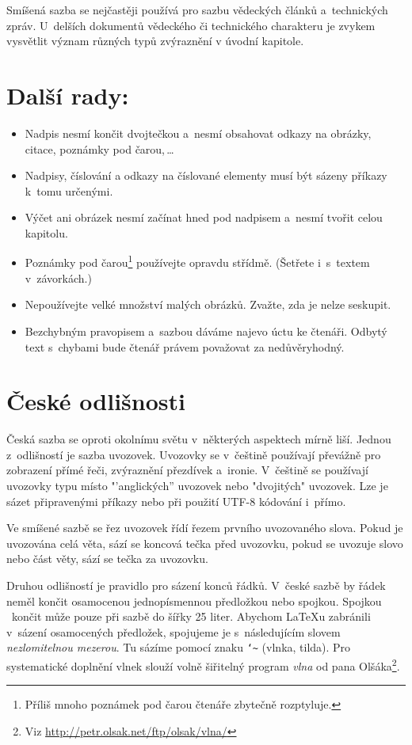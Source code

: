\documentclass[10pt, a4paper, twocolumn]{article}
\begin{document}
Smíšená sazba se nejčastěji používá pro sazbu vědeckých článků a~technických zpráv. U~delších dokumentů vědeckého či technického charakteru je zvykem vysvětlit význam různých typů zvýraznění v úvodní kapitole.

\section{Další rady:}\label{sec:DaRa}

\begin{itemize}
\item Nadpis nesmí končit dvojtečkou a~nesmí obsahovat odkazy na obrázky, citace, poznámky pod čarou,\,\dots
\item Nadpisy, číslování a odkazy na číslované elementy musí být sázeny příkazy k~tomu určenými.
\item Výčet ani obrázek nesmí začínat hned pod nadpisem a~nesmí tvořit celou kapitolu.
\item Poznámky pod čarou\footnote{Příliš mnoho poznámek pod čarou čtenáře zbytečně rozptyluje.} používejte opravdu střídmě. (Šetřete i~s~textem v~závorkách.)
\item Nepoužívejte velké množství malých obrázků. Zvažte, zda je nelze seskupit.
\item Bezchybným pravopisem a~sazbou dáváme najevo úctu ke čtenáři. Odbytý text s~chybami bude čtenář právem považovat za nedůvěryhodný.
\end{itemize}

\section{České odlišnosti}

Česká sazba se oproti okolnímu světu v~některých aspektech mírně liší. Jednou z~odlišností je sazba uvozovek. Uvozovky se v~češtině používají převážně pro zobrazení přímé řeči, zvýraznění přezdívek a~ironie. V~češtině se používají uvozovky typu  místo "'anglických'' uvozovek nebo "dvojitých" uvozovek. Lze je sázet připravenými příkazy nebo při použití UTF-8 kódování i~přímo.

Ve smíšené sazbě se řez uvozovek řídí řezem prvního uvozovaného slova. Pokud je uvozována celá věta, sází se koncová tečka před uvozovku, pokud se uvozuje slovo nebo část věty, sází se tečka za uvozovku.

Druhou odlišností je pravidlo pro sázení konců řádků. V~české sazbě by řádek neměl končit osamocenou jednopísmennou předložkou nebo spojkou. Spojkou ~končit může pouze při sazbě do šířky 25 liter. Abychom \LaTeX u zabránili v~sázení osamocených předložek, spojujeme je s~následujícím slovem \emph{nezlomitelnou mezerou}. Tu sázíme pomocí znaku  \texttt{\char`\~} (vlnka, tilda). Pro systematické doplnění vlnek slouží volně šiřitelný program \emph{vlna} od pana Olšáka\footnote{Viz \url{http://petr.olsak.net/ftp/olsak/vlna/}}.
\end{document}

